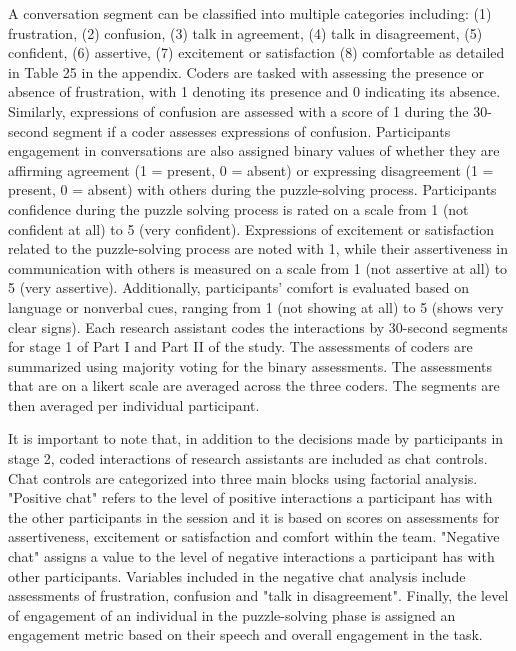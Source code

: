 A conversation segment can be classified into multiple categories including: (1) frustration, (2) confusion, (3) talk in agreement, (4) talk in disagreement, (5) confident, (6) assertive, (7) excitement or satisfaction (8) comfortable as detailed in Table 25 in the appendix. Coders are tasked with assessing the presence or absence of frustration, with 1 denoting its presence and 0 indicating its absence. Similarly, expressions of confusion are assessed with a score of 1 during the 30-second segment if a coder assesses expressions of confusion. Participants engagement in conversations are also assigned binary values of whether they are affirming agreement (1 = present, 0 = absent) or expressing disagreement (1 = present, 0 = absent) with others during the puzzle-solving process. Participants confidence during the puzzle solving process is rated on a scale from 1 (not confident at all) to 5 (very confident). Expressions of excitement or satisfaction related to the puzzle-solving process are noted with 1, while their assertiveness in communication with others is measured on a scale from 1 (not assertive at all) to 5 (very assertive). Additionally, participants' comfort is evaluated based on language or nonverbal cues, ranging from 1 (not showing at all) to 5 (shows very clear signs). Each research assistant codes the interactions by 30-second segments for stage 1 of Part I and Part II of the study. The assessments of coders are summarized using majority voting for the binary assessments. The assessments that are on a likert scale are averaged across the three coders. The segments are then averaged per individual participant. 

It is important to note that, in addition to the decisions made by participants in stage 2, coded interactions of research assistants are included as chat controls. Chat controls are categorized into three main blocks using factorial analysis. "Positive chat" refers to the level of positive interactions a participant has with the other participants in the session and it is based on scores on assessments for assertiveness, excitement or satisfaction and comfort within the team. "Negative chat" assigns a value to the level of negative interactions a participant has with other participants. Variables included in the negative chat analysis include assessments of frustration, confusion and "talk in disagreement". Finally, the level of engagement of an individual in the puzzle-solving phase is assigned an engagement metric based on their speech and overall engagement in the task. 


